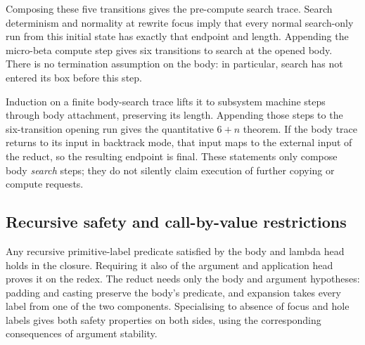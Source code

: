 


Composing these five transitions gives the pre-compute search trace.
Search determinism and normality at rewrite focus imply that every normal
search-only run from this initial state has exactly that endpoint and length.
Appending the micro-beta compute step gives six transitions to search at the
opened body. There is no termination assumption on the body: in particular,
search has not entered its box before this step.




Induction on a finite body-search trace lifts it to subsystem machine
steps through body attachment, preserving its length. Appending those steps
to the six-transition opening run gives the quantitative $6+n$ theorem.
If the body trace returns to its input in backtrack mode, that input maps to
the external input of the reduct, so the resulting endpoint is final.
These statements only compose body \emph{search} steps; they do not silently
claim execution of further copying or compute requests.




\subsection{Recursive safety and call-by-value restrictions}

Any recursive primitive-label predicate satisfied by the body and
lambda head holds in the closure. Requiring it also of the argument and
application head proves it on the redex. The reduct needs only the body and
argument hypotheses: padding and casting preserve the body's predicate,
and expansion takes every label from one of the two components. Specialising
to absence of focus and hole labels gives both safety properties on both
sides, using the corresponding consequences of argument stability.

